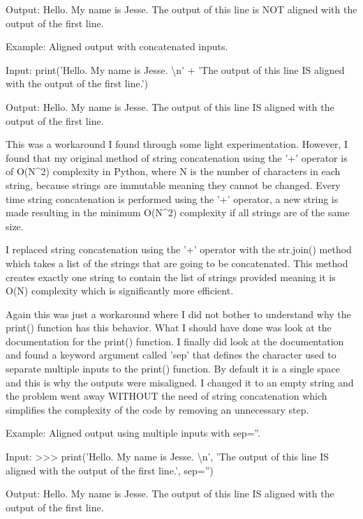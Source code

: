 \documentclass[11pt]{article}
\begin{document}
Output: Hello. My name is Jesse.
         The output of this line is NOT aligned with the output of the first line.
         
Example: Aligned output with concatenated inputs.

Input: print('Hello. My name is Jesse. {\textbackslash}n' +
             'The output of this line IS aligned with the output of the first line.')
                 
Output: Hello. My name is Jesse.
        The output of this line IS aligned with the output of the first line.
         
This was a workaround I found through some light experimentation. However, I found that my original method of string concatenation using the '+' operator is of O(N{\textasciicircum}2) complexity in Python, where N is the number of characters in each string, because strings are immutable meaning they cannot be changed. Every time string concatenation is performed using the '+' operator, a new string is made resulting in the minimum O(N{\textasciicircum}2) complexity if all strings are of the same size. 

I replaced string concatenation using the '+' operator with the str.join() method which takes a list of the strings that are going to be concatenated. This method creates exactly one string to contain the list of strings provided meaning it is O(N) complexity which is significantly more efficient. 

Again this was just a workaround where I did not bother to understand why the print() function has this behavior. What I should have done was look at the documentation for the print() function. I finally did look at the documentation and found a keyword argument called 'sep' that defines the character used to separate multiple inputs to the print() function. By default it is a single space and this is why the outputs were misaligned. I changed it to an empty string and the problem went away WITHOUT the need of string concatenation which simplifies the complexity of the code by removing an unnecessary step.

Example: Aligned output using multiple inputs with sep=''.

Input: >>> print('Hello. My name is Jesse. {\textbackslash}n',
                 'The output of this line IS aligned with the output of the first line.', sep='')
                 
Output: Hello. My name is Jesse.
        The output of this line IS aligned with the output of the first line.
\end{document}
